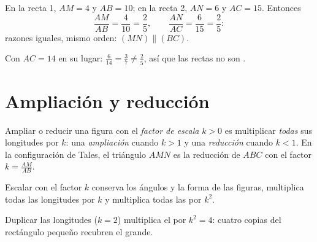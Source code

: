 \begin{example}\label{ex:g9:thales:converse}
En la recta 1, $AM = 4$ y $AB = 10$; en la recta 2, $AN = 6$ y $AC = 15$.
Entonces
\[
\frac{AM}{AB} = \frac{4}{10} = \frac25,
\qquad
\frac{AN}{AC} = \frac{6}{15} = \frac25 :
\]
razones iguales, mismo orden: $(MN) \parallel (BC)$.

Con $AC = 14$ en su lugar: $\frac{6}{14} = \frac37 \neq \frac25$, así que las
rectas no son .
\end{example}

\section{Ampliación y reducción}

\begin{definition}\label{def:g9:thales:scaling}
Ampliar o reducir una figura con el \emph{factor de
escala} $k > 0$ es multiplicar \emph{todas} sus
longitudes por $k$: una \emph{ampliación} cuando $k > 1$ y una \emph{reducción}
cuando $k < 1$. En la configuración de Tales, el triángulo $AMN$ es la
reducción de $ABC$ con el factor $k = \frac{AM}{AB}$.
\end{definition}

\begin{proposition}\label{prop:g9:thales:scaling}
Escalar con el factor $k$ conserva los ángulos y la forma de las figuras,
multiplica todas las longitudes por $k$ y multiplica todas las \emph{} por
$k^2$.
\end{proposition}
\admitted

\begin{omfigure}

{\small Duplicar las longitudes ($k = 2$) multiplica el  por
$k^2 = 4$: cuatro copias del rectángulo pequeño recubren el grande.}
\end{omfigure}

